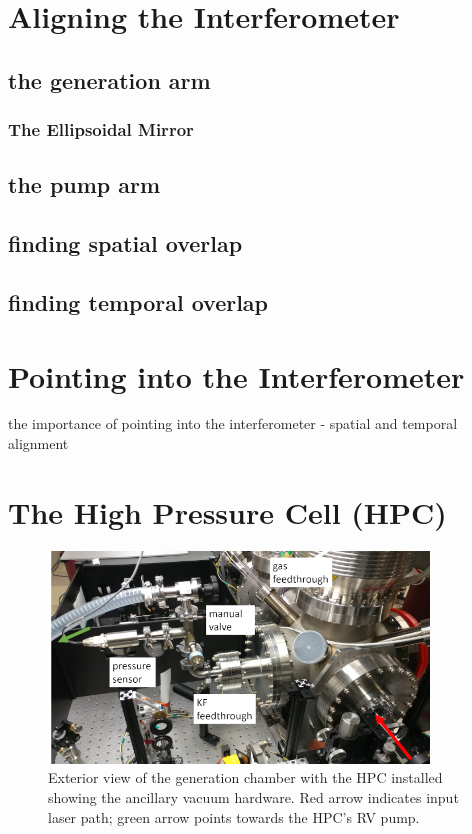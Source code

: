 \section{Aligning the Interferometer}
\label{app:aligning-interferometer}

\subsection{the generation arm}

\subsubsection{The Ellipsoidal Mirror}

\subsection{the pump arm}

\subsection{finding spatial overlap}

\subsection{finding temporal overlap}

\section{Pointing into the Interferometer}
\label{app:pointing-into-TABLE}

the importance of pointing into the interferometer - spatial and temporal alignment

\section{The High Pressure Cell (HPC)}
\label{app:HPC_instructions}

\begin{figure}
	\centering
	\includegraphics[width=0.9\textwidth]{figures/app1/HPC_outside_view_lowres.png}
	\caption{Exterior view of the generation chamber with the HPC installed showing the ancillary vacuum hardware. Red arrow indicates input laser path; green arrow points towards the HPC's RV pump.}
	\label{fig:HPC_outside_view}
\end{figure}

